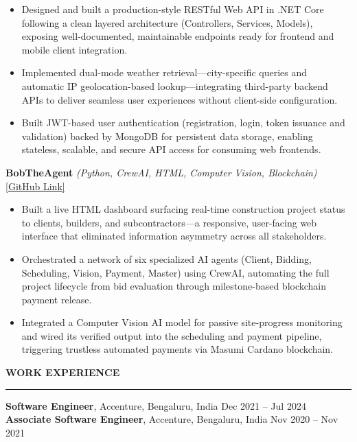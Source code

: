 \documentclass[letterpaper,10.5pt]{extarticle}
\newcommand{\resumesection}[1]{%
    \vspace{6pt}%
    \noindent\textbf{#1}\vspace{-5pt}%
    \\\noindent\rule{\textwidth}{0.5pt}%
    \vspace{1pt}%
}
\begin{document}
\begin{itemize}[leftmargin=12pt, topsep=1pt, itemsep=0pt, parsep=0pt]
    \item Designed and built a production-style RESTful Web API in .NET Core following a clean layered architecture (Controllers, Services, Models), exposing well-documented, maintainable endpoints ready for frontend and mobile client integration.
    \item Implemented dual-mode weather retrieval---city-specific queries and automatic IP geolocation-based lookup---integrating third-party backend APIs to deliver seamless user experiences without client-side configuration.
    \item Built JWT-based user authentication (registration, login, token issuance and validation) backed by MongoDB for persistent data storage, enabling stateless, scalable, and secure API access for consuming web frontends.
\end{itemize}

\vspace{4pt}

\noindent\textbf{BobTheAgent} \textit{(Python, CrewAI, HTML, Computer Vision, Blockchain)} \hfill \href{https://github.com/slowloris-98/BobTheAgent}{[GitHub Link]}

\begin{itemize}[leftmargin=12pt, topsep=1pt, itemsep=0pt, parsep=0pt]
    \item Built a live HTML dashboard surfacing real-time construction project status to clients, builders, and subcontractors---a responsive, user-facing web interface that eliminated information asymmetry across all stakeholders.
    \item Orchestrated a network of six specialized AI agents (Client, Bidding, Scheduling, Vision, Payment, Master) using CrewAI, automating the full project lifecycle from bid evaluation through milestone-based blockchain payment release.
    \item Integrated a Computer Vision AI model for passive site-progress monitoring and wired its verified output into the scheduling and payment pipeline, triggering trustless automated payments via Masumi Cardano blockchain.
\end{itemize}

\resumesection{WORK EXPERIENCE}

\noindent\textbf{Software Engineer}, Accenture, Bengaluru, India \hfill Dec 2021 -- Jul 2024\\
\noindent\textbf{Associate Software Engineer}, Accenture, Bengaluru, India \hfill Nov 2020 -- Nov 2021
\end{document}
